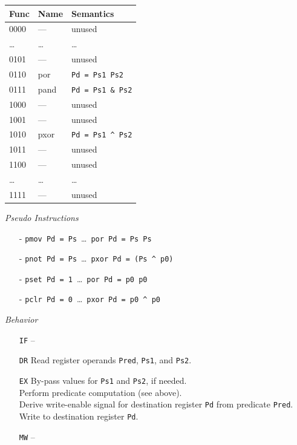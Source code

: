 \documentclass{IEEEtran}
\newcommand{\XOR}{\textasciicircum\xspace}
\newcommand{\OR}{\textbar\xspace}
\newcommand{\AND}{\&\xspace}
\newcommand{\NOT}{\texttildelow}
\begin{document}
\begin{tabular}{lll}
  Func & Name   & Semantics \\ \hline
  0000 & ---    & unused \\
  \dots& \dots  & \dots \\
  0101 & ---    & unused \\
  0110 & por     & \texttt{Pd = Ps1 \OR Ps2} \\
  0111 & pand    & \texttt{Pd = Ps1 \AND Ps2} \\
  1000 & ---    & unused \\
  1001 & ---    & unused \\
  1010 & pxor    & \texttt{Pd = Ps1 \XOR Ps2} \\
  1011 & ---    & unused \\
  1100 & ---    & unused \\
  \dots& \dots  & \dots \\
  1111 & ---    & unused \\ \hline
\end{tabular}

\vspace{7mm}
\emph{Pseudo Instructions}
\begin{itemize}
  \item[-] \texttt{pmov Pd = Ps}~\dots~\texttt{por Pd = Ps \OR Ps}
  \item[-] \texttt{pnot Pd = \NOT Ps}~\dots~\texttt{pxor Pd = (Ps \XOR p0)}
  \item[-] \texttt{pset Pd = 1}~\dots~\texttt{por Pd = p0 \OR p0}
  \item[-] \texttt{pclr Pd = 0}~\dots~\texttt{pxor Pd = p0 \XOR p0}
\end{itemize}

\vspace{7mm}
\emph{Behavior}
\begin{itemize}
  \item[\texttt{IF}] --
  \item[\texttt{DR}] Read register operands \texttt{Pred}, \texttt{Ps1}, and
                     \texttt{Ps2}.
  \item[\texttt{EX}] By-pass values for \texttt{Ps1} and \texttt{Ps2}, if
                     needed. \\
                     Perform predicate computation (see above). \\
                     Derive write-enable signal for destination register
                     \texttt{Pd} from predicate \texttt{Pred}. \\
                     Write to destination register \texttt{Pd}.
  \item[\texttt{MW}] --
\end{itemize}
\end{document}
